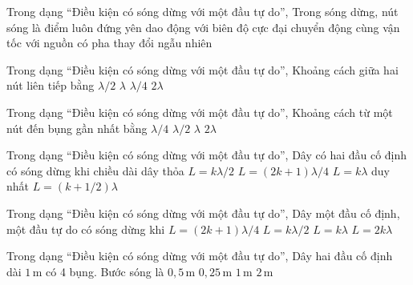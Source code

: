 \begin{ex}
Trong dạng “Điều kiện có sóng dừng với một đầu tự do”, Trong sóng dừng, nút sóng là điểm
\choice
{\True luôn đứng yên}
{dao động với biên độ cực đại}
{chuyển động cùng vận tốc với nguồn}
{có pha thay đổi ngẫu nhiên}
\end{ex}

\begin{ex}
Trong dạng “Điều kiện có sóng dừng với một đầu tự do”, Khoảng cách giữa hai nút liên tiếp bằng
\choice
{\True $\lambda/2$}
{$\lambda$}
{$\lambda/4$}
{$2\lambda$}
\end{ex}

\begin{ex}
Trong dạng “Điều kiện có sóng dừng với một đầu tự do”, Khoảng cách từ một nút đến bụng gần nhất bằng
\choice
{\True $\lambda/4$}
{$\lambda/2$}
{$\lambda$}
{$2\lambda$}
\end{ex}

\begin{ex}
Trong dạng “Điều kiện có sóng dừng với một đầu tự do”, Dây có hai đầu cố định có sóng dừng khi chiều dài dây thỏa
\choice
{\True $L=k\lambda/2$}
{$L=(2k+1)\lambda/4$}
{$L=k\lambda$ duy nhất}
{$L=(k+1/2)\lambda$}
\end{ex}

\begin{ex}
Trong dạng “Điều kiện có sóng dừng với một đầu tự do”, Dây một đầu cố định, một đầu tự do có sóng dừng khi
\choice
{\True $L=(2k+1)\lambda/4$}
{$L=k\lambda/2$}
{$L=k\lambda$}
{$L=2k\lambda$}
\end{ex}

\begin{ex}
Trong dạng “Điều kiện có sóng dừng với một đầu tự do”, Dây hai đầu cố định dài $1\,\text{m}$ có 4 bụng. Bước sóng là
\choice
{\True $0,5\,\text{m}$}
{$0,25\,\text{m}$}
{$1\,\text{m}$}
{$2\,\text{m}$}
\end{ex}

